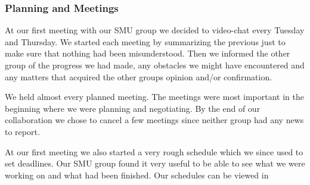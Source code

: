 \subsubsection{Planning and Meetings}
At our first meeting with our SMU group we decided to video-chat every Tuesday and Thursday. We started each meeting by summarizing the previous just to make sure that nothing had been misunderstood. Then we informed the other group of the progress we had made, any obstacles we might have encountered and any matters that acquired the other groups opinion and/or confirmation. 

We held almost every planned meeting. The meetings were most important in the beginning where we were planning and negotiating. By the end of our collaboration we chose to cancel a few meetings since neither group had any news to report.

At our first meeting we also started a very rough schedule which we since used to set deadlines. Our SMU group found it very useful to be able to see what we were working on and what had been finished.
Our schedules can be viewed in 
